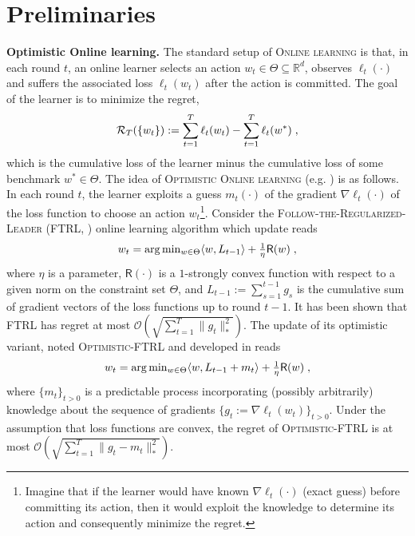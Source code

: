 \documentclass[11pt]{article}
\theoremstyle{k}
\begin{document}
\section{Preliminaries}\label{sec:prelim}
\textbf{Optimistic Online learning.}\hspace{0.1cm}
The standard setup of \textsc{Online learning} is that, in each round $t$, an online learner selects an action $w_{t} \in \Theta \subseteq \mathbb R^{d}$, observes $\ell_{t}(\cdot)$ and suffers the associated loss $\ell_{t}(w_t)$ after the action is committed.
The goal of the learner is to minimize the regret, 
$$\mathcal{R}_{T}( \{ w_t \} ):= \sum_{t=1}^T \ell_{t}(w_t) - \sum_{t=1}^T \ell_{t}(w^*)\;,$$
which is the cumulative loss of the learner minus the cumulative loss of some benchmark $w^{*} \in \Theta$.
The idea of \textsc{Optimistic Online learning} (e.g. \citep{CJ12,rakhlin2013online,SALS15,ALLW18}) is as follows.
In each round $t$, the learner exploits a guess $m_t(\cdot)$ of the gradient $\nabla \ell_t(\cdot)$ of the loss function to choose an action $w_t$\footnote{Imagine that if the learner would have known $\nabla \ell_t(\cdot)$ (\ie exact guess) before committing its action, then it would exploit the knowledge to determine its action and consequently minimize the regret.}. 
Consider the \textsc{Follow-the-Regularized-Leader} (\textsc{FTRL}, \citep{H14}) online learning algorithm which update reads
\begin{equation} \notag
\textstyle w_t  = \arg \min_{w \in \Theta} \langle w , L_{t-1} \rangle + \frac{1}{\eta} \textsf{R}(w) \;,
\end{equation}
where $\eta$ is a parameter, $\textsf{R}(\cdot)$ is a $1$-strongly convex function with respect to a given norm on the constraint set $\Theta$, and $L_{t-1}:= \sum_{s=1}^{t-1} g_s$ is the cumulative sum of gradient vectors of the loss functions up to round $t-1$. It has been shown that FTRL has regret at most $\mathcal{O}(\sqrt{\sum_{t=1}^T \| g_t \|_*^2})$.
The update of its optimistic variant, noted \textsc{Optimistic-FTRL} and developed in \citep{SALS15} reads
\begin{equation} \label{optFTRL}
\textstyle w_t  = \arg \min_{w \in \Theta} \langle w , L_{t-1} + m_t \rangle + \frac{1}{\eta} \textsf{R}(w)\;,
\end{equation}
where $\{m_{t}\}_{t>0}$ is a predictable process incorporating (possibly arbitrarily) knowledge about the sequence of gradients $\{ g_{t}:=\nabla \ell_t(w_t)\}_{t>0}$.
Under the assumption that loss functions are convex, the regret of \textsc{Optimistic-FTRL} is at most $\mathcal{O}(\sqrt{\sum_{t=1}^T \| g_t - m_t \|_*^2 } )$.
\end{document}
